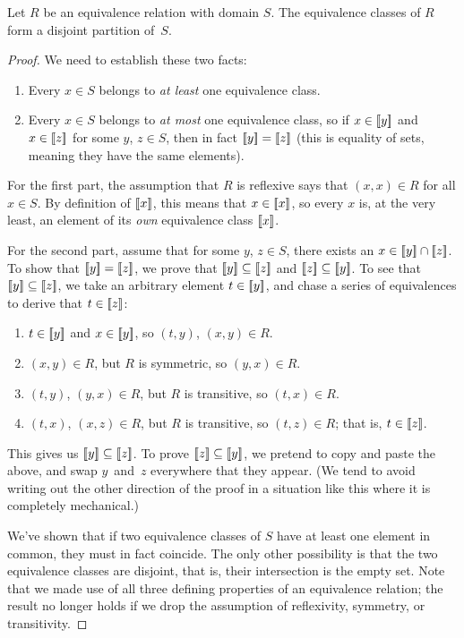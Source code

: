 \documentclass[../generics]{subfiles}
\begin{document}
\begin{proposition}
Let $R$ be an equivalence relation with domain $S$. The equivalence classes of $R$ form a disjoint partition of~$S$.
\end{proposition}
\begin{proof}
We need to establish these two facts:
\begin{enumerate}
\item Every $x\in S$ belongs to \emph{at least} one equivalence class.
\item Every $x\in S$ belongs to \emph{at most} one equivalence class, so if $x\in[\![y]\!]$ and $x\in[\![z]\!]$ for some $y$, $z\in S$, then in fact $[\![y]\!]=[\![z]\!]$ (this is equality of sets, meaning they have the same elements).
\end{enumerate}

For the first part, the assumption that $R$ is reflexive says that $(x,x)\in R$ for all $x\in S$. By definition of $[\![x]\!]$, this means that $x\in[\![x]\!]$, so every $x$ is, at the very least, an element of its \emph{own} equivalence class $[\![x]\!]$.

For the second part, assume that for some $y$, $z\in S$, there exists an $x\in[\![y]\!]\cap[\![z]\!]$. To show that $[\![y]\!]=[\![z]\!]$, we prove that $[\![y]\!]\subseteq[\![z]\!]$ and $[\![z]\!]\subseteq[\![y]\!]$. To see that $[\![y]\!]\subseteq[\![z]\!]$, we take an arbitrary element $t\in[\![y]\!]$, and chase a series of equivalences to derive that $t\in[\![z]\!]$:
\begin{enumerate}
\item $t\in[\![y]\!]$ and $x\in[\![y]\!]$, so $(t,y)$, $(x,y)\in R$.
\item $(x,y)\in R$, but $R$ is symmetric, so $(y,x)\in R$.
\item $(t,y)$, $(y,x)\in R$, but $R$ is transitive, so $(t,x)\in R$.
\item $(t,x)$, $(x,z)\in R$, but $R$ is transitive, so $(t,z)\in R$; that is, $t\in[\![z]\!]$.
\end{enumerate}
This gives us $[\![y]\!]\subseteq[\![z]\!]$. To prove $[\![z]\!]\subseteq[\![y]\!]$, we pretend to copy and paste the above, and swap $y$~and~$z$ everywhere that they appear. (We tend to avoid writing out the other direction of the proof in a situation like this where it is completely mechanical.)

We've shown that if two equivalence classes of $S$ have at least one element in common, they must in fact coincide. The only other possibility is that the two equivalence classes are disjoint, that is, their intersection is the empty set. Note that we made use of all three defining properties of an equivalence relation; the result no longer holds if we drop the assumption of reflexivity, symmetry, or transitivity.
\end{proof}
\end{document}
